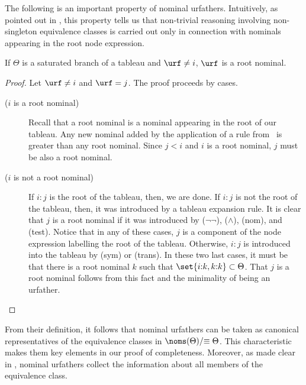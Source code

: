 The following is an important property of nominal urfathers.
Intuitively, as pointed out in \cite{Brauner2011}, this property tells us that non-trivial reasoning involving non-singleton equivalence classes is carried out only in connection with nominals appearing in the root node expression.

\begin{lem}\label{lemma:representative}
    If $\Theta$ is a saturated branch of a tableau and $\urf \neq i$, $\urf$ is a root nominal.
\end{lem}
\begin{proof}
    Let $\urf \neq i$ and $\urf = j$.
    The proof proceeds by cases.
    
    \begin{description}
        \item[($i$ is a root nominal)]
        Recall that a root nominal is a nominal appearing in the root of our tableau. Any new nominal added by the application of a rule from~ is greater than any root nominal. Since $j < i$ and $i$ is a root nominal, $j$ must be also a root nominal.

        \item[($i$ is not a root nominal)]
        If $i{:}j$ is the root of the tableau, then, we are done.
        If $i{:}j$ is not the root of the tableau, then, it was introduced by a tableau expansion rule.
        It is clear that $j$ is a root nominal if it was introduced by ($\lnot\lnot$), ($\land$), (nom), and (test).
        Notice that in any of these cases, $j$ is a component of the node expression labelling the root of the tableau.
        Otherwise, $i{:}j$ is introduced into the tableau by (sym) or (trans).
        In these two last cases, it must be that there is a root nominal $k$ such that $\set{i{:}k, k{:}k} \subset \Theta$.
        That $j$ is a root nominal follows from this fact and the minimality of being an urfather.
    \end{description}
\end{proof}

From their definition, it follows that nominal urfathers can be taken as canonical representatives of the equivalence classes in $\noms(\Theta)/{\equiv\Theta}$.
This characteristic makes them key elements in our proof of completeness.
Moreover, as made clear in , nominal urfathers collect the information about all members of the equivalence class.

